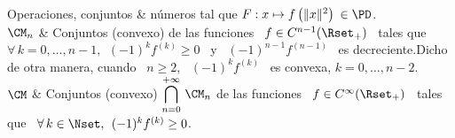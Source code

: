 \begin{notation}{Operaciones, conjuntos \& n\'umeros}
tal que $F: x \mapsto f\left( \|x\|^2 \right) \: \in \PD$.\\[2.5mm]
\hline
%
$\CM_n$ & Conjuntos (convexo) de las funciones \ $f \in C^{n-1}(\Rset_+)$ \
tales que \ $\forall \, k = 0 , \ldots , n-1, \:\: (-1)^k f^{(k)} \ge 0$ \ y \
$(-1)^{n-1} f^{(n-1)}$ \ es decreciente.\newline Dicho de otra manera, cuando \
$n \ge 2$, \ $(-1)^k f^{(k)}$ \ es convexa, $k = 0, \ldots , n-2$.\\[2.5mm]
\hline
%
$\CM$ & Conjuntos (convexo) $\displaystyle \bigcap_{n=0}^{+\infty} \, \CM_n$ de
las funciones \ $f \in C^{\infty}(\Rset_+)$ \ tales que \ $\forall \, k \in
\Nset, \:\: (-1)^k f^{(k)} \ge 0$.
\end{notation}
